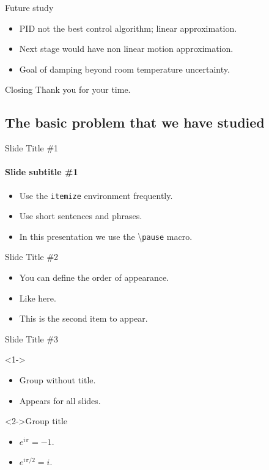 \documentclass{beamer}
\begin{document}
\begin{frame}{Future study}
	\begin{itemize}
		
		\item PID not the best control algorithm; linear approximation. 
		\item Next stage would have non linear motion approximation.
		\item Goal of damping beyond room temperature uncertainty. 
	\end{itemize}
\end{frame}

\begin{frame}{Closing}
	\centering
	Thank you for your time. \\[12pt]
	
\end{frame}

\iffalse

\subsection[Basic Problem]{The basic problem that we have studied}

\begin{frame}{Slide Title \#1}
	\framesubtitle{Slide subtitle \#1}
	\begin{itemize}
		\item Use the \texttt{itemize} environment frequently.
		\pause
		\item Use short sentences and phrases.
		\pause
		\item In this presentation we use the \textbackslash{}\texttt{pause} macro.
	\end{itemize}
\end{frame}

\begin{frame}{Slide Title \#2}
	\begin{itemize}
		\item <1->You can define the order of appearance.
		\item <3->Like here.
		\item <2->This is the second item to appear.
	\end{itemize}
\end{frame}

\begin{frame}{Slide Title \#3}
	\begin{block}
		<1->{}
		\begin{itemize}
			\item Group without title.
			\item Appears for all slides.
		\end{itemize}
	\end{block}
	\begin{exampleblock}
		<2->{Group title}
		\begin{itemize}
			\item $e^{i\pi}=-1$.
			\item $e^{i\pi/2}=i$.
		\end{itemize}
	\end{exampleblock}
\end{frame}
\end{document}
